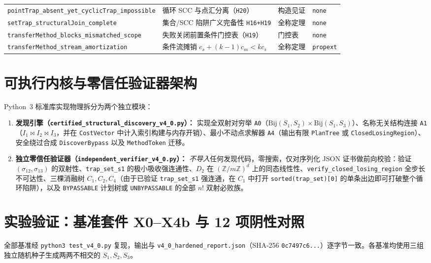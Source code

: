 \documentclass[10pt,a4paper]{article}
\newcommand{\code}[1]{\nolinkurl{#1}}
\begin{document}
\begin{table}[!htbp]
\begin{tabularx}{\linewidth}{@{}>{\raggedright\arraybackslash}p{6.5cm}>{\raggedright\arraybackslash}Xll@{}}
\code{pointTrap_absent_yet_cyclicTrap_impossible} & 循环 SCC 与点汇分离（\code{H20}） & 构造见证 & \code{none} \\
\code{setTrap_structuralJoin_complete} & 集合/SCC 陷阱广义完备性 \code{H16+H19} & 全称定理 & \code{none} \\
\code{transferMethod_blocks_mismatched_scope} & 失败关闭前置条件门控表（\code{H19}） & 门控表 & \code{none} \\
\code{transferMethod_stream_amortization} & 条件流摊销 $c_s+(k-1)c_m<kc_s$ & 全称定理 & \code{propext} \\
\bottomrule
\end{tabularx}
\end{table}

\section{可执行内核与零信任验证器架构}

Python~3 标准库实现物理拆分为两个独立模块：
\begin{enumerate}
\item \textbf{发现引擎（\code{certified_structural_discovery_v4_0.py}）：} 实现全双射对穷举 \code{A0}（$\mathrm{Bij}(S_1, S_2) \times \mathrm{Bij}(S_1, S_3)$）、名称无关结构连接 \code{A1}（$I_1 \bowtie I_2 \bowtie I_3$，并在 \code{CostVector} 中计入索引构建与内存开销）、最小不动点求解器 \code{A4}（输出有限 \code{PlanTree} 或 \code{ClosedLosingRegion}）、安全绕过合成 \code{DiscoverBypass} 以及 \code{MethodToken} 迁移。
\item \textbf{独立零信任验证器（\code{independent_verifier_v4_0.py}）：} \emph{不导入}任何发现代码，零搜索，仅对序列化 JSON 证书做前向校验：验证 $(\sigma_{12}, \sigma_{13})$ 的双射性、\code{trap_set_s1} 的极小吸收强连通性、$D_2$ 在 $(\mathbb{Z}/m\mathbb{Z})^d$ 上的同态线性性、\code{verify_closed_losing_region} 全步长不可达性、三棵消融树 $C_1, C_2, C_4$（由于已验证 \code{trap_set_s1} 强连通，在 $C_1$ 中打开 \code{sorted(trap_set)[0]} 的单条出边即可打破整个循环陷阱），以及 \code{BYPASSABLE} 计划树或 \code{UNBYPASSABLE} 的全部 $n!$ 双射必败族。
\end{enumerate}

\section{实验验证：基准套件 X0--X4b 与 12 项阴性对照}

全部基准经 \texttt{python3 test\_v4\_0.py} 复现，输出与 \code{v4_0_hardened_report.json}（SHA-256 \code{0c7497c6...}）逐字节一致。各基准均使用三组独立随机种子生成两两不相交的 $S_1, S_2, S_3$。
\end{document}
